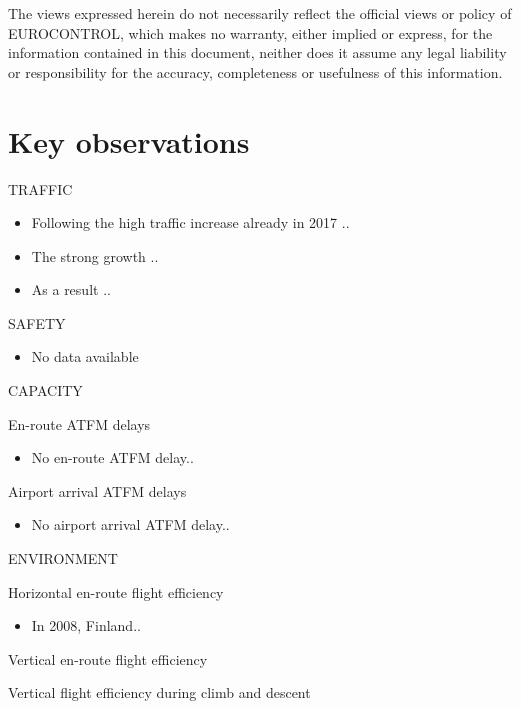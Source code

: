 \documentclass[
]{article}
\providecommand{\tightlist}{%
  \setlength{\itemsep}{0pt}\setlength{\parskip}{0pt}}
\begin{document}
The views expressed herein do not necessarily reflect the official views or policy of EUROCONTROL, which makes no warranty, either implied or express, for the information contained in this document, neither does it assume any legal liability or responsibility for the accuracy, completeness or usefulness of this information.

\newpage

\hypertarget{key-observations}{%
\section*{Key observations}\label{key-observations}}

TRAFFIC

\begin{itemize}
\item
  Following the high traffic increase already in 2017 ..
\item
  The strong growth ..
\item
  As a result ..
\end{itemize}

SAFETY

\begin{itemize}
\tightlist
\item
  No data available
\end{itemize}

CAPACITY

En-route ATFM delays

\begin{itemize}
\tightlist
\item
  No en-route ATFM delay..
\end{itemize}

Airport arrival ATFM delays

\begin{itemize}
\tightlist
\item
  No airport arrival ATFM delay..
\end{itemize}

ENVIRONMENT

Horizontal en-route flight efficiency

\begin{itemize}
\tightlist
\item
  In 2008, Finland..
\end{itemize}

Vertical en-route flight efficiency

Vertical flight efficiency during climb and descent
\end{document}
